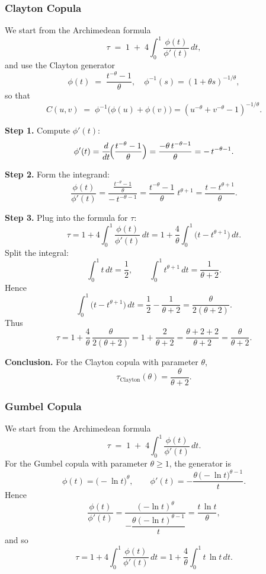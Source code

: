 \documentclass[11pt]{article}
\begin{document}
\subsubsection{Clayton Copula}
We start from the Archimedean formula
\[
\tau \;=\; 1 \;+\; 4 \int_{0}^{1} \frac{\phi(t)}{\phi'(t)} \, dt,
\]
and use the Clayton generator
\[
\phi(t) \;=\; \frac{t^{-\theta} - 1}{\theta}, 
\quad
\phi^{-1}(s)=(1+\theta s)^{-1/\theta},
\]
so that
\[
C(u,v) \;=\; \phi^{-1}\bigl(\phi(u)+\phi(v)\bigr)
=(u^{-\theta}+v^{-\theta}-1)^{-1/\theta}.
\]

\bigskip
\textbf{Step 1.} Compute \(\phi'(t)\):
\[
\phi'(t)
= \frac{d}{dt}\!\Bigl(\frac{t^{-\theta}-1}{\theta}\Bigr)
= \frac{-\theta\,t^{-\theta-1}}{\theta}
= -\,t^{-\theta-1}.
\]

\bigskip
\textbf{Step 2.} Form the integrand:
\[
\frac{\phi(t)}{\phi'(t)}
= \frac{\frac{t^{-\theta}-1}{\theta}}{-\,t^{-\theta-1}}
= \frac{t^{-\theta}-1}{\theta}\;t^{\theta+1}
= \frac{t - t^{\theta+1}}{\theta}.
\]

\bigskip
\textbf{Step 3.} Plug into the formula for \(\tau\):
\[
\tau
= 1 + 4 \int_{0}^{1} \frac{\phi(t)}{\phi'(t)}\,dt
= 1 + \frac{4}{\theta}
  \int_{0}^{1} \bigl(t - t^{\theta+1}\bigr)\,dt.
\]
Split the integral:
\[
\int_{0}^{1} t \, dt = \frac12,
\qquad
\int_{0}^{1} t^{\theta+1}\,dt = \frac{1}{\theta+2}.
\]
Hence
\[
\int_{0}^{1} \bigl(t - t^{\theta+1}\bigr)\,dt
= \frac12 - \frac{1}{\theta+2}
= \frac{\theta}{2(\theta+2)}.
\]
Thus
\[
\tau
= 1 + \frac{4}{\theta}\,\frac{\theta}{2(\theta+2)}
= 1 + \frac{2}{\theta+2}
= \frac{\theta+2+2}{\theta+2}
= \frac{\theta}{\theta+2}.
\]

\bigskip
\textbf{Conclusion.} For the Clayton copula with parameter \(\theta\),
\[
\boxed{
\tau_{\mathrm{Clayton}}(\theta)
= \frac{\theta}{\theta+2}.
}
\]

\subsubsection{Gumbel Copula}
We start from the Archimedean formula
\[
\tau \;=\; 1 \;+\; 4\int_{0}^{1}\frac{\phi(t)}{\phi'(t)}\,dt.
\]
For the Gumbel copula with parameter \(\theta\ge1\), the generator is
\[
\phi(t)=\bigl(-\ln t\bigr)^{\theta},\qquad
\phi'(t)
=-\frac{\theta\,\bigl(-\ln t\bigr)^{\theta-1}}{t}.
\]
Hence
\[
\frac{\phi(t)}{\phi'(t)}
=\frac{(-\ln t)^\theta}{-\dfrac{\theta(-\ln t)^{\theta-1}}{t}}
=\frac{t\,\ln t}{\theta},
\]
and so
\[
\tau
=1+4\int_{0}^{1}\frac{\phi(t)}{\phi'(t)}\,dt
=1+\frac{4}{\theta}\int_{0}^{1}t\,\ln t\,dt.
\]
\end{document}

